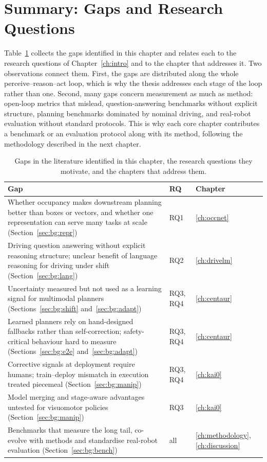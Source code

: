 \section{Summary: Gaps and Research Questions}\label{sec:bg:summary}

Table~\ref{tab:bg:gaps} collects the gaps identified in this chapter and relates each to the research questions of Chapter~\ref{ch:intro} and to the chapter that addresses it. Two observations connect them. First, the gaps are distributed along the whole perceive--reason--act loop, which is why the thesis addresses each stage of the loop rather than one. Second, many gaps concern measurement as much as method: open-loop metrics that mislead, question-answering benchmarks without explicit structure, planning benchmarks dominated by nominal driving, and real-robot evaluation without standard protocols. This is why each core chapter contributes a benchmark or an evaluation protocol along with its method, following the methodology described in the next chapter.

\begin{table}[t]
  \centering
  \caption[Gaps in the literature and where this thesis addresses them]{Gaps in the literature identified in this chapter, the research questions they motivate, and the chapters that address them.}
  \label{tab:bg:gaps}
  \footnotesize
  \renewcommand{\arraystretch}{1.2}
  \begin{tabularx}{\textwidth}{@{}X p{1.2cm} p{1.6cm}@{}}
    \toprule
    Gap & RQ & Chapter \\
    \midrule
    Whether occupancy makes downstream planning better than boxes or vectors, and whether one representation can serve many tasks at scale (Section~\ref{sec:bg:repr}) & RQ1 & \ref{ch:occnet} \\
    Driving question answering without explicit reasoning structure; unclear benefit of language reasoning for driving under shift (Section~\ref{sec:bg:lang}) & RQ2 & \ref{ch:drivelm} \\
    Uncertainty measured but not used as a learning signal for multimodal planners (Sections~\ref{sec:bg:shift} and~\ref{sec:bg:adapt}) & RQ3, RQ4 & \ref{ch:centaur} \\
    Learned planners rely on hand-designed fallbacks rather than self-correction; safety-critical behaviour hard to measure (Sections~\ref{sec:bg:e2e} and~\ref{sec:bg:adapt}) & RQ3, RQ4 & \ref{ch:centaur} \\
    Corrective signals at deployment require humans; train--deploy mismatch in execution treated piecemeal (Section~\ref{sec:bg:manip}) & RQ3, RQ4 & \ref{ch:kai0} \\
    Model merging and stage-aware advantages untested for visuomotor policies (Section~\ref{sec:bg:manip}) & RQ3 & \ref{ch:kai0} \\
    Benchmarks that measure the long tail, co-evolve with methods and standardise real-robot evaluation (Section~\ref{sec:bg:bench}) & all & \ref{ch:methodology}, \ref{ch:discussion} \\
    \bottomrule
  \end{tabularx}
\end{table}
